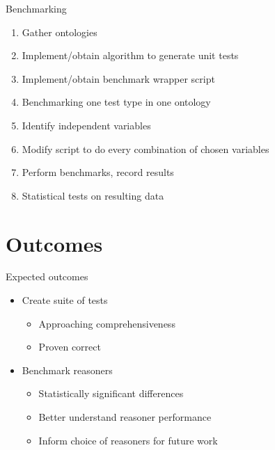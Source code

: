 \documentclass[17pt,mathserif]{beamer}
\begin{document}
\begin{frame}[allowframebreaks]{Benchmarking}
  \begin{enumerate}
    \item Gather ontologies
    \item Implement/obtain algorithm to generate unit tests
    \item Implement/obtain benchmark wrapper script
    \item Benchmarking one test type in one ontology
    \item Identify independent variables
    \item Modify script to do every combination of chosen variables
    \item Perform benchmarks, record results
    \item Statistical tests on resulting data
  \end{enumerate}
\end{frame}

\section{Outcomes}

\begin{frame}{Expected outcomes}
  \begin{itemize}
    \item Create suite of tests
    \begin{itemize}
      \item Approaching comprehensiveness
      \item Proven correct
    \end{itemize}
    \item Benchmark reasoners
    \begin{itemize}
      \item Statistically significant differences
      \item Better understand reasoner performance
      \item Inform choice of reasoners for future work
    \end{itemize}
  \end{itemize}
\end{frame}
\end{document}
